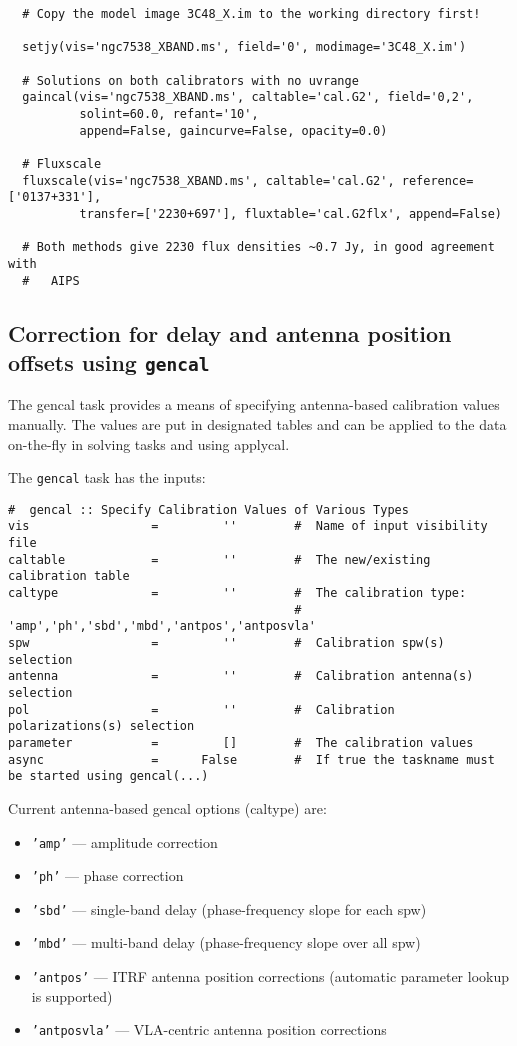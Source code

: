 {\begin{verbatim}
  # Copy the model image 3C48_X.im to the working directory first!

  setjy(vis='ngc7538_XBAND.ms', field='0', modimage='3C48_X.im')

  # Solutions on both calibrators with no uvrange
  gaincal(vis='ngc7538_XBAND.ms', caltable='cal.G2', field='0,2',
          solint=60.0, refant='10', 
          append=False, gaincurve=False, opacity=0.0)

  # Fluxscale
  fluxscale(vis='ngc7538_XBAND.ms', caltable='cal.G2', reference=['0137+331'],
          transfer=['2230+697'], fluxtable='cal.G2flx', append=False)

  # Both methods give 2230 flux densities ~0.7 Jy, in good agreement with
  #   AIPS
\end{verbatim}
\normalsize


\subsection{Correction for delay and antenna position offsets 
   using {\tt gencal}}
\label{section:cal.prior.gencal}


The gencal task provides a means of specifying antenna-based
calibration values manually.  The values are put in designated tables
and can be applied to the data on-the-fly in solving tasks and 
using applycal.

The {\tt gencal} task has the inputs:
\small
\begin{verbatim}
#  gencal :: Specify Calibration Values of Various Types
vis                 =         ''        #  Name of input visibility file
caltable            =         ''        #  The new/existing calibration table
caltype             =         ''        #  The calibration type:
                                        #   'amp','ph','sbd','mbd','antpos','antposvla'
spw                 =         ''        #  Calibration spw(s) selection
antenna             =         ''        #  Calibration antenna(s) selection
pol                 =         ''        #  Calibration polarizations(s) selection
parameter           =         []        #  The calibration values
async               =      False        #  If true the taskname must be started using gencal(...)
\end{verbatim}
\normalsize


Current antenna-based gencal options (caltype) are:
\begin{itemize}
   \item {\tt 'amp'} --- amplitude correction
   \item {\tt 'ph'} --- phase correction
   \item {\tt 'sbd'} --- single-band delay (phase-frequency slope for each spw)
   \item {\tt 'mbd'} --- multi-band delay (phase-frequency slope over all spw)
   \item {\tt 'antpos'} --- ITRF antenna position corrections
     (automatic parameter lookup is supported)
   \item {\tt 'antposvla'} --- VLA-centric antenna position corrections 
\end{itemize}

}
